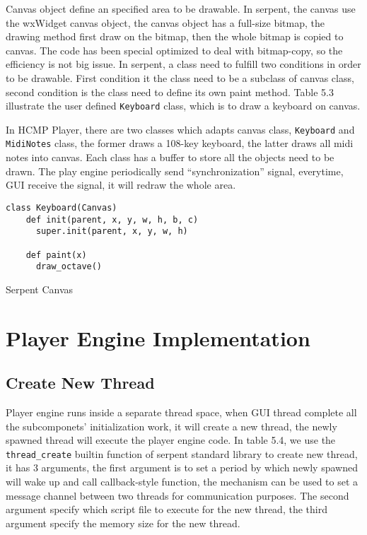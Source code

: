 Canvas object define an specified area to be drawable. In serpent, the canvas 
use the wxWidget canvas object, the canvas object has a full-size bitmap, 
the drawing method
first draw on the bitmap, then the whole bitmap is copied to canvas. The code 
has been special optimized to deal with bitmap-copy, so the efficiency is not 
big issue. In serpent, a class need to fulfill two conditions in order 
to be drawable. First condition it
the class need to be a subclass of canvas class, second condition is the class  
need to define its own paint method. Table 5.3 illustrate the user defined 
\texttt{Keyboard} class, which is to draw a keyboard on canvas.

In HCMP Player, there are two classes which adapts canvas class, \texttt{Keyboard} 
and \texttt{MidiNotes} class, the former draws a 108-key keyboard, the latter
draws all midi notes into canvas. Each class has a buffer to store all the objects
need to be drawn. The play engine periodically send ``synchronization'' signal,  
everytime, GUI receive the signal, it will redraw the whole area.

\begin{table}[htdp]
\centering

\begin{lstlisting}
class Keyboard(Canvas)
    def init(parent, x, y, w, h, b, c)
      super.init(parent, x, y, w, h)

    def paint(x)
      draw_octave()
\end{lstlisting}
\caption[Serpent Canvas]{Serpent Canvas}
\end{table}

\section{Player Engine Implementation}

\subsection{Create New Thread}
Player engine runs inside a separate thread space, when GUI thread complete all
the subcomponets' initialization work, it will create a new thread, the newly
spawned thread will execute the player engine code. In table 5.4, we use the   
\texttt{thread\_create} builtin function of serpent standard library to create 
new thread, it has 3 arguments, 
the first argument is to set a period by which newly spawned will wake up and call 
callback-style function, the mechanism can be used to set a message channel between 
two threads for communication purposes. The second argument specify 
which script file to execute for the new thread, the third argument specify the 
memory size for the new thread.

